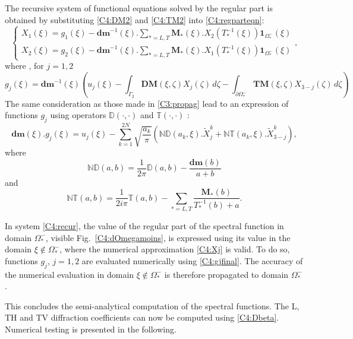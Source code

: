 The recursive system of functional equations solved by the regular part is obtained by substituting \eqref{C4:DM2} and \eqref{C4:TM2} into \eqref{C4:regparteqn}:
\begin{equation}
\left\{
\begin{matrix}
X_1(\xi) =g_1(\xi)-\textbf{dm}^{-1}(\xi).\underset{*=L,T}{\sum} \mathbf{M}_*(\xi).X_2(T_*^{-1}(\xi))\textbf{1}_{\Omega_*^-}(\xi) \\
X_2(\xi) =g_2(\xi)-\textbf{dm}^{-1}(\xi).\underset{*=L,T}{\sum} \mathbf{M}_*(\xi).X_1(T_*^{-1}(\xi))\textbf{1}_{\Omega_*^-}(\xi)
\end{matrix}
\right.,
\label{C4:recur}
\end{equation}
where , for $j=1,2$
\begin{equation}
g_j(\xi)=\textbf{dm}^{-1}(\xi)\left( u_j(\xi)- \int_{\Gamma_2}  \textbf{DM}(\xi,\zeta)X_j(\zeta)\, d\zeta- \int_{\partial \Omega_*^-}  \textbf{TM}(\xi,\zeta)X_{3-j}(\zeta)\, d\zeta \right) 
\label{C4:g1g2}
\end{equation}
The same consideration as those made in \ref{C3:propag} lead to an expression of functions $g_j$ using operators $\mathbb{D}(\cdot,\cdot)$ and $\mathbb{T}(\cdot,\cdot)$ :
\begin{equation}
\textbf{dm}(\xi).g_j(\xi)=u_j(\xi)-\sum_{k=1}^{2N} \sqrt{\frac{a_k}{\pi}}\left( \mathbb{ND}(a_k,\xi).\tilde{X}_j^k+\mathbb{NT}(a_k,\xi).\tilde{X}_{3-j}^k \right) ,
\label{C4:gjfinal}
\end{equation}
where
\begin{equation}
\mathbb{ND}(a,b)=\frac{1}{2\pi}\mathbb{D}(a,b)-\frac{\textbf{dm}(b)}{a+b}
\label{C4:defND}
\end{equation}
and
\begin{equation}
\mathbb{NT}(a,b)=\frac{1}{2i\pi}\mathbb{T}(a,b)-\sum_{*=L,T}\frac{\mathbf{M}_*(b)}{T^{-1}_*(b)+a} .
\end{equation}

In system \eqref{C4:recur}, the value of the regular part of the spectral function in domain $\Omega_*^-$, visible Fig.~\ref{C4:dOmegamoins}, is expressed using its value in the domain $\xi \notin \Omega_*^-$, where the numerical approximation \eqref{C4:Xj} is valid. To do so, functions $g_j,\, j=1,2$ are evaluated numerically using \eqref{C4:gjfinal}. The accuracy of the numerical evaluation in domain $\xi \notin \Omega_*^-$ is therefore propagated to domain $\Omega_*^-$. 

This concludes the semi-analytical computation of the spectral functions. The L, TH and TV diffraction coefficients can now be computed using \eqref{C4:Dbeta}. Numerical testing is presented in the following. 

